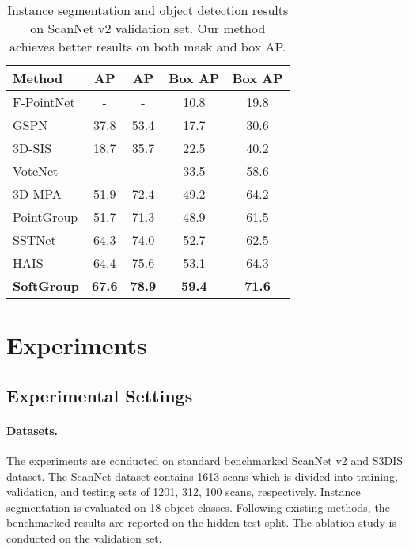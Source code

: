 \documentclass[10pt,twocolumn,letterpaper]{article}
\begin{document}
	\begin{table}[]
		\setlength{\tabcolsep}{5pt}
		\centering
		\begin{tabular}{lcccc} \toprule
			Method     & AP & AP & Box AP & Box AP \\ \midrule
			F-PointNet \cite{qi2018frustum} & -      & -      & 10.8    & 19.8    \\
			GSPN \cite{yi2019gspn}       & 37.8   & 53.4   & 17.7    & 30.6    \\
			3D-SIS \cite{hou20193d}    & 18.7   & 35.7   & 22.5    & 40.2    \\
			VoteNet \cite{qi2019deep}   & -      & -      & 33.5    & 58.6    \\
			3D-MPA \cite{engelmann20203d}    & 51.9   & 72.4   & 49.2    & 64.2    \\
			PointGroup \cite{jiang2020pointgroup} & 51.7   & 71.3   & 48.9    & 61.5    \\
			SSTNet \cite{liang2021instance}    & 64.3   & 74.0     & 52.7    & 62.5    \\
			HAIS \cite{chen2021hierarchical}      & 64.4   & 75.6   & 53.1    & 64.3    \\
			\textbf{SoftGroup} & \textbf{67.6}   & \textbf{78.9}   & \textbf{59.4}    & \textbf{71.6}    \\ \bottomrule 
		\end{tabular}
		\caption{Instance segmentation and object detection results on ScanNet v2 validation set. Our method achieves better results on both mask and box AP.}
		\label{tab:segmentation_detection}
	\end{table}	
	
	
	
	
	
	
	
	\section{Experiments}
	\subsection{Experimental Settings}
	\paragraph{Datasets.}
	The experiments are conducted on standard benchmarked ScanNet v2 \cite{dai2017scannet} and S3DIS \cite{armeni20163d} dataset. The ScanNet dataset contains 1613 scans which is divided into training, validation, and testing sets of 1201, 312, 100 scans, respectively. Instance segmentation is evaluated on 18 object classes. Following existing methods, the benchmarked results are reported on the hidden test split. The ablation study is conducted on the validation set. 
	
\end{document}

